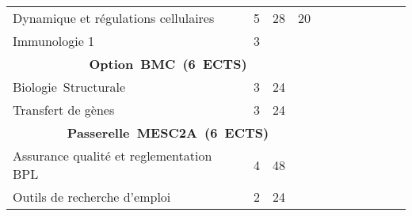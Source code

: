 \begin{tabular}{|m{5cm}|cm{0.75cm}|cm{0.75cm}|cm{0.75cm}|cm{0.75cm}|cm{0.75cm}|}
 \color{black} Dynamique et régulations cellulaires & \color{black} 5 & \color{black} 28 & \color{black} 20 & \\ \cline{1-5}

 \cellcolor{couleurClaire} \color{couleurTexte} Immunologie 1 & \cellcolor{couleurClaire} \color{couleurTexte} 3 & \cellcolor{couleurClaire} \color{couleurTexte} & \cellcolor{couleurClaire} \color{couleurTexte} & \cellcolor{couleurClaire} 
\\ \cline{1-5}
\multicolumn{5}{|c|}{\color{black} \mbox{\textbf{Option BMC (6 ECTS)}}}  \\ \cline{1-5}

 \color{black} \mbox{Biologie Structurale} & \color{black} 3 & \color{black} 24 & \color{black} & \color{black} \\ \cline{1-5}

 \cellcolor{couleurClaire} \color{couleurTexte} Transfert de gènes  & \cellcolor{couleurClaire} \color{couleurTexte} 3 & \cellcolor{couleurClaire} \color{couleurTexte} 24 & \cellcolor{couleurClaire} \color{couleurTexte} & \cellcolor{couleurClaire} \color{couleurTexte} \\ \cline{1-5}

\multicolumn{5}{|c|}{\color{black} \mbox{\textbf{Passerelle MESC2A (6 ECTS)}}}  \\ \cline{1-5}

 \color{black} Assurance qualité et reglementation BPL & \color{black} 4 & \color{black} 48 & \color{black} & \color{black} \\ \cline{1-5}

 \cellcolor{couleurClaire} \color{couleurTexte} Outils de recherche d'emploi  & \cellcolor{couleurClaire} \color{couleurTexte} 2 & \cellcolor{couleurClaire} \color{couleurTexte} 24 & \cellcolor{couleurClaire} \color{couleurTexte} & \cellcolor{couleurClaire} \color{couleurTexte} \\ \cline{1-5}

\end{tabular}

